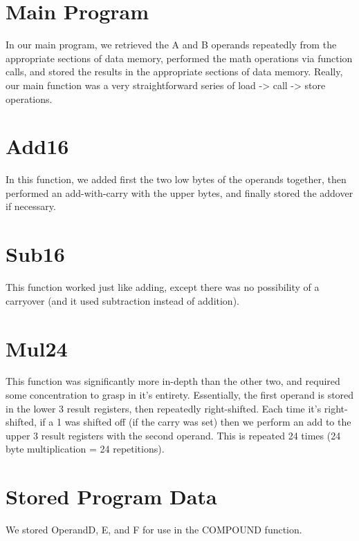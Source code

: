 \documentclass[12pt,letterpaper]{article}
\begin{document}
\section{Main Program}
In our main program, we retrieved the A and B operands repeatedly from the appropriate sections of data memory, performed the math operations via function calls, and stored the results in the appropriate sections of data memory. Really, our main function was a very straightforward series of load -> call -> store operations.

\section{Add16}
In this function, we added first the two low bytes of the operands together, then performed an add-with-carry with the upper bytes, and finally stored the addover if necessary.

\section{Sub16}
This function worked just like adding, except there was no possibility of a carryover (and it used subtraction instead of addition).

\section{Mul24}
This function was significantly more in-depth than the other two, and required some concentration to grasp in it's entirety. Essentially, the first operand is stored in the lower 3 result registers, then repeatedly right-shifted. Each time it's right-shifted, if a 1 was shifted off (if the carry was set) then we perform an add to the upper 3 result registers with the second operand. This is repeated 24 times (24 byte multiplication = 24 repetitions).

\section{Stored Program Data}
We stored OperandD, E, and F for use in the COMPOUND function.
\end{document}
